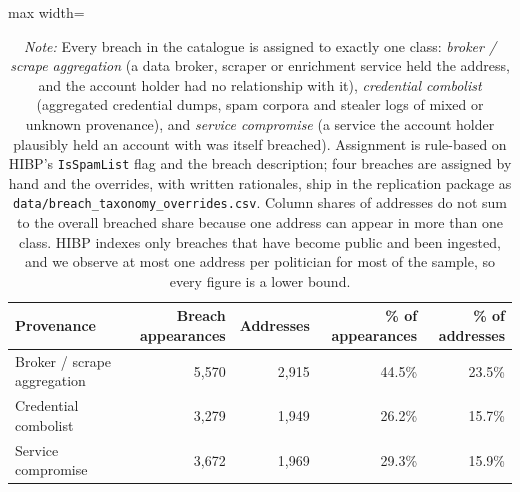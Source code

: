 \begin{table}[!htbp]
\centering
\footnotesize
\def\sym#1{\ifmmode^{#1}\else\(^{#1}\)\fi}
\caption{Breach appearances by how the data was exposed}
\label{tab:breach_taxonomy}
\begin{adjustbox}{max width=\linewidth}
\begin{tabular}{lrrrr}
\toprule\toprule
Provenance & Breach appearances & Addresses & \% of appearances & \% of addresses \\
\midrule
Broker / scrape aggregation & 5,570 & 2,915 & 44.5\% & 23.5\% \\
Credential combolist & 3,279 & 1,949 & 26.2\% & 15.7\% \\
Service compromise & 3,672 & 1,969 & 29.3\% & 15.9\% \\
\bottomrule
\end{tabular}
\end{adjustbox}
\caption*{\scriptsize \emph{Note:} Every breach in the catalogue is assigned to exactly one class: \emph{broker / scrape aggregation} (a data broker, scraper or enrichment service held the address, and the account holder had no relationship with it), \emph{credential combolist} (aggregated credential dumps, spam corpora and stealer logs of mixed or unknown provenance), and \emph{service compromise} (a service the account holder plausibly held an account with was itself breached). Assignment is rule-based on HIBP's \texttt{IsSpamList} flag and the breach description; four breaches are assigned by hand and the overrides, with written rationales, ship in the replication package as \texttt{data/breach\_taxonomy\_overrides.csv}. Column shares of addresses do not sum to the overall breached share because one address can appear in more than one class. HIBP indexes only breaches that have become public and been ingested, and we observe at most one address per politician for most of the sample, so every figure is a lower bound.}
\end{table}
